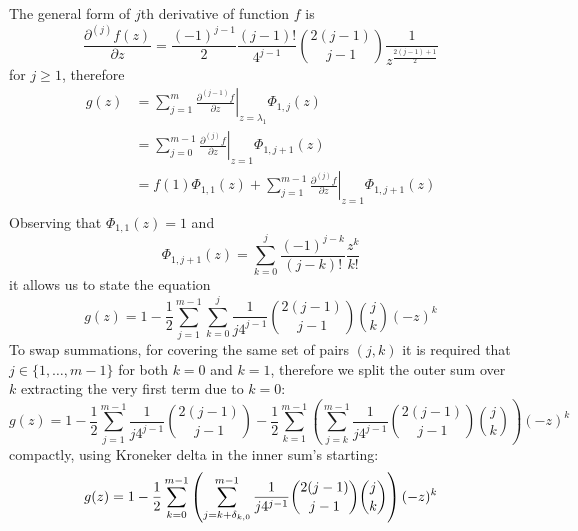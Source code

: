 
The general form of $j$th derivative of function $f$ is 
$$\frac{\partial^{(j)}{f}(z)}{\partial{z}} =\frac{(-1)^{j-1}}{2}\frac{(j-1)!}{4^{j-1}}{{2(j-1)}\choose{j-1}}\frac{1}{z^{\frac{2(j-1)+1}{2}}} $$ 
for $j \geq 1$, therefore
\begin{displaymath}
\begin{split}
  g(z) &= \sum_{j=1}^{m}{ \left. \frac{\partial^{(j-1)}{f}}{\partial{z}} \right|_{z=\lambda_{1}}\Phi_{1,j}(z)} \\
       &= \sum_{j=0}^{m-1}{ \left. \frac{\partial^{(j)}{f}}{\partial{z}} \right|_{z=1}\Phi_{1,j+1}(z)} \\
       &= f(1)\Phi_{1,1}(z) + \sum_{j=1}^{m-1}{ \left. \frac{\partial^{(j)}{f}}{\partial{z}} \right|_{z=1}\Phi_{1,j+1}(z)} \\
\end{split}
\end{displaymath}
Observing that $\Phi_{1,1}(z)=1$ and
\begin{displaymath}
  \Phi_{1,j+1}(z) = \sum_{k=0}^{j}{\frac{(-1)^{j-k}}{(j-k)!}\frac{z^{k}}{k!}}
\end{displaymath}
it allows us to state the equation
\begin{equation}
  g(z) = 1 - \frac{1}{2} \sum_{j=1}^{m-1}{\sum_{k=0}^{j}{\frac{1}{j 4^{j-1}} {{2(j-1)}\choose{j-1}}{{j}\choose{k}} (-z)^{k}}}
\end{equation}
To swap summations, for covering the same set of pairs $(j, k)$ it is required that 
$j\in \lbrace 1, \ldots, m-1 \rbrace$ for both $k=0$ and $k=1$, therefore we split
the outer sum over $k$ extracting the very first term due to $k=0$:
\begin{equation}
  g(z) = 1 - \frac{1}{2}\sum_{j=1}^{m-1}{\frac{1}{j 4^{j-1}} {{2(j-1)}\choose{j-1}}} 
       - \frac{1}{2} \sum_{k=1}^{m-1}{\left(\sum_{j=k}^{m-1}{\frac{1}{j 4^{j-1}} {{2(j-1)}\choose{j-1}}{{j}\choose{k}}}\right)(-z)^{k}} 
\end{equation}
compactly, using Kroneker delta in the inner sum's starting:
\begin{equation}
  g(z) = 1 - \frac{1}{2} \sum_{k=0}^{m-1}{\left(\sum_{j=k+\delta_{k,0}}^{m-1}{\frac{1}{j 4^{j-1}} {{2(j-1)}\choose{j-1}}{{j}\choose{k}}}\right)(-z)^{k}} \\
\end{equation}

